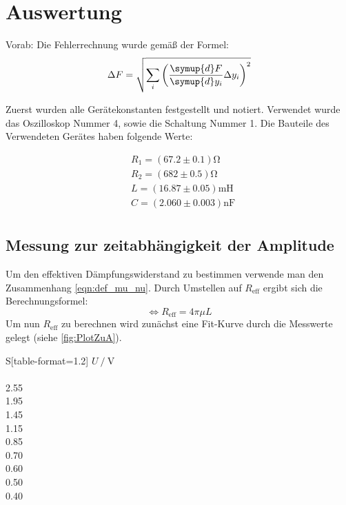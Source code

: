 \section{Auswertung}
\label{sec:Auswertung}
Vorab: Die Fehlerrechnung wurde gemäß der Formel:
\begin{equation}
  \label{eqn:Gauss}
  \Delta F = \sqrt{\sum_i\left(\frac{\symup{d}F}{\symup{d}y_i}\Delta y_i \right)^2}
\end{equation}

Zuerst wurden alle Gerätekonstanten festgestellt und notiert. Verwendet wurde das Oszilloskop Nummer 4, sowie
die Schaltung Nummer 1. Die Bauteile des Verwendeten Gerätes haben folgende Werte:

\begin{align*}
  &R_1 = (67.2 \pm 0.1) \unit{\ohm} \\
  &R_2 = (682 \pm 0.5) \unit{\ohm}  \\
  &L   = (16.87 \pm 0.05) \unit{\milli\henry} \\
  &C   = (2.060 \pm 0.003) \unit{\nano\farad} \\
\end{align*}

\subsection{Messung zur zeitabhängigkeit der Amplitude}
\label{subsec:AuswertungA}

Um den effektiven Dämpfungswiderstand zu bestimmen verwende man den Zusammenhang \eqref{eqn:def_mu_nu}.
Durch Umstellen auf $R_{\text{eff}}$ ergibt sich die Berechnungsformel:
\begin{equation}
  \label{Abklingdauer1}
  \Longleftrightarrow R_{\text{eff}} = 4\pi\mu L
\end{equation}
Um nun $R_{\text{eff}}$ zu berechnen wird zunächst eine Fit-Kurve durch die Messwerte gelegt (siehe \autoref{fig:PlotZuA}).

\begin{table}
  \centering
  \caption{Messdaten zur Zeitabhängigkeit der Amplitude.}
  \label{tab:Mess1}
  \begin{tabular}{S[table-format=1.2]}
      \toprule
      $U \mathbin{/} \unit{\volt}$ \\
       \\
      2.55 \\
      1.95 \\
      1.45 \\
      1.15 \\
      0.85 \\
      0.70 \\
      0.60 \\
      0.50 \\
      0.40 \\
  \bottomrule 
  \end{tabular}
\end{table}

